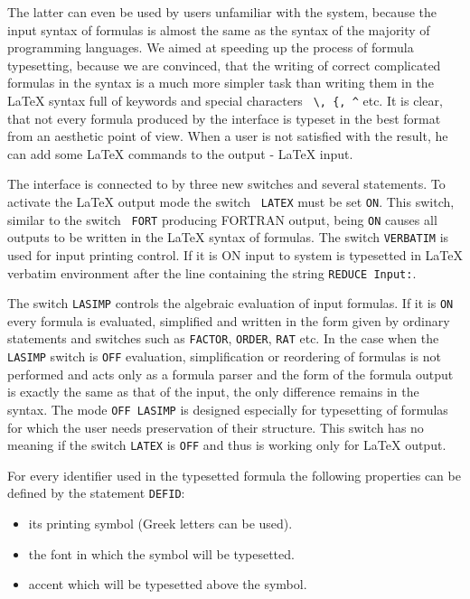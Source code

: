 The latter can even be used by users unfamiliar with the \REDUCE{}
system, because the \REDUCE{} input syntax of formulas is almost the
same as the syntax of the majority of programming languages.  We aimed
at speeding up the process of formula typesetting, because we are
convinced, that the writing of correct complicated formulas in the
\REDUCE{} syntax is a much more simpler task than writing them in the
\LaTeX{} syntax full of keywords and special characters \verb+ \, {, ^+
etc.  It is clear, that not every formula produced by the interface is
typeset in the best format from an aesthetic point of view.  When a user
is not satisfied with the result, he can add some \LaTeX{} commands to the
\REDUCE{} output - \LaTeX{} input.

The interface is connected to \REDUCE{} by three new switches and
several statements.  To activate the \LaTeX{} output mode the switch {\tt
LATEX} must be set {\tt ON}.  This switch, similar to the switch {\tt
FORT} producing FORTRAN output, being {\tt ON} causes all outputs to be
written in the \LaTeX{} syntax of formulas.  The switch {\tt VERBATIM} is
used for input printing control.  If it is ON input to \REDUCE{} system
is typesetted in \LaTeX{} verbatim environment after the line containing
the string {\tt REDUCE Input:}.

The switch {\tt LASIMP} controls the algebraic evaluation of input
formulas.  If it is {\tt ON} every formula is evaluated, simplified and
written in the form given by ordinary \REDUCE{} statements and switches
such as {\tt FACTOR}, {\tt ORDER}, {\tt RAT} etc.  In the case when the
{\tt LASIMP} switch is {\tt OFF} evaluation, simplification or
reordering of formulas is not performed and \REDUCE{} acts only as a
formula parser and the form of the formula output is exactly the same as
that of the input, the only difference remains in the syntax.  The mode
{\tt OFF LASIMP} is designed especially for typesetting of formulas for
which the user needs preservation of their structure.  This switch has
no meaning if the switch {\tt LATEX} is {\tt OFF} and thus is working
only for \LaTeX{} output.

For every  identifier  used  in  the  typesetted  \REDUCE{}  formula
the following properties can be defined by the statement {\tt DEFID}:
\begin{itemize}
\item its printing symbol (Greek letters can be used).
\item the font in which the symbol will be typesetted.
\item accent which will be typesetted above the symbol.
\end{itemize}

